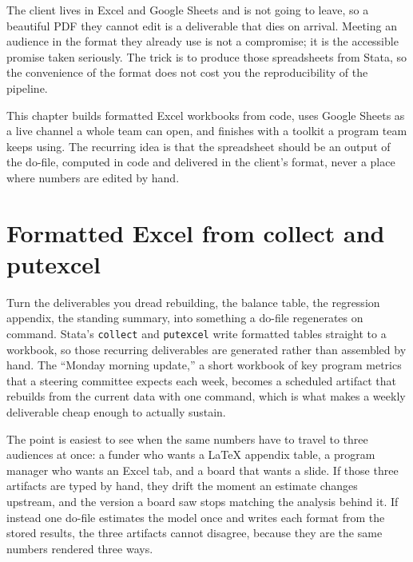 \documentclass[
    a4paper,
    fontsize=10pt,
    twoside=true,
    numbers=noenddot,
]{kaobook}
\begin{document}
The client lives in Excel and Google Sheets and is not going to leave, so a beautiful PDF they cannot edit is a deliverable that dies on arrival. Meeting an audience in the format they already use is not a compromise; it is the accessible promise taken seriously. The trick is to produce those spreadsheets from Stata, so the convenience of the format does not cost you the reproducibility of the pipeline.

This chapter builds formatted Excel workbooks from code, uses Google Sheets as a live channel a whole team can open, and finishes with a toolkit a program team keeps using. The recurring idea is that the spreadsheet should be an output of the do-file, computed in code and delivered in the client's format, never a place where numbers are edited by hand.

\section{Formatted Excel from collect and putexcel}
Turn the deliverables you dread rebuilding, the balance table, the regression appendix, the standing summary, into something a do-file regenerates on command. Stata's \texttt{collect} and \texttt{putexcel} write formatted tables straight to a workbook, so those recurring deliverables are generated rather than assembled by hand. The \enquote{Monday morning update,} a short workbook of key program metrics that a steering committee expects each week, becomes a scheduled artifact that rebuilds from the current data with one command, which is what makes a weekly deliverable cheap enough to actually sustain.

The point is easiest to see when the same numbers have to travel to three audiences at once: a funder who wants a \LaTeX{} appendix table, a program manager who wants an Excel tab, and a board that wants a slide. If those three artifacts are typed by hand, they drift the moment an estimate changes upstream, and the version a board saw stops matching the analysis behind it. If instead one do-file estimates the model once and writes each format from the stored results, the three artifacts cannot disagree, because they are the same numbers rendered three ways.
\end{document}
